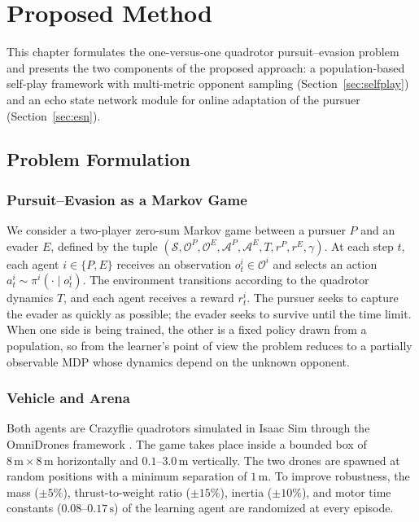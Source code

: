 
\chapter{Proposed Method}
\label{ch:method}

This chapter formulates the one-versus-one quadrotor pursuit--evasion problem and presents the two components of the proposed approach: a population-based self-play framework with multi-metric opponent sampling (Section~\ref{sec:selfplay}) and an echo state network module for online adaptation of the pursuer (Section~\ref{sec:esn}).

\section{Problem Formulation}
\label{sec:problem}

\subsection{Pursuit--Evasion as a Markov Game}
\noindent
We consider a two-player zero-sum Markov game between a pursuer $P$ and an evader $E$, defined by the tuple $(\mathcal{S}, \mathcal{O}^P, \mathcal{O}^E, \mathcal{A}^P, \mathcal{A}^E, T, r^P, r^E, \gamma)$. At each step $t$, each agent $i \in \{P, E\}$ receives an observation $o^i_t \in \mathcal{O}^i$ and selects an action $a^i_t \sim \pi^i(\cdot \mid o^i_t)$. The environment transitions according to the quadrotor dynamics $T$, and each agent receives a reward $r^i_t$. The pursuer seeks to capture the evader as quickly as possible; the evader seeks to survive until the time limit. When one side is being trained, the other is a fixed policy drawn from a population, so from the learner's point of view the problem reduces to a partially observable MDP whose dynamics depend on the unknown opponent.

\subsection{Vehicle and Arena}
\noindent
Both agents are Crazyflie quadrotors simulated in Isaac Sim through the OmniDrones framework \cite{xuOmniDronesEfficientFlexible2023}. The game takes place inside a bounded box of $8\,\text{m} \times 8\,\text{m}$ horizontally and $0.1$--$3.0\,\text{m}$ vertically. The two drones are spawned at random positions with a minimum separation of $1\,\text{m}$. To improve robustness, the mass ($\pm 5\%$), thrust-to-weight ratio ($\pm 15\%$), inertia ($\pm 10\%$), and motor time constants ($0.08$--$0.17\,\text{s}$) of the learning agent are randomized at every episode.

